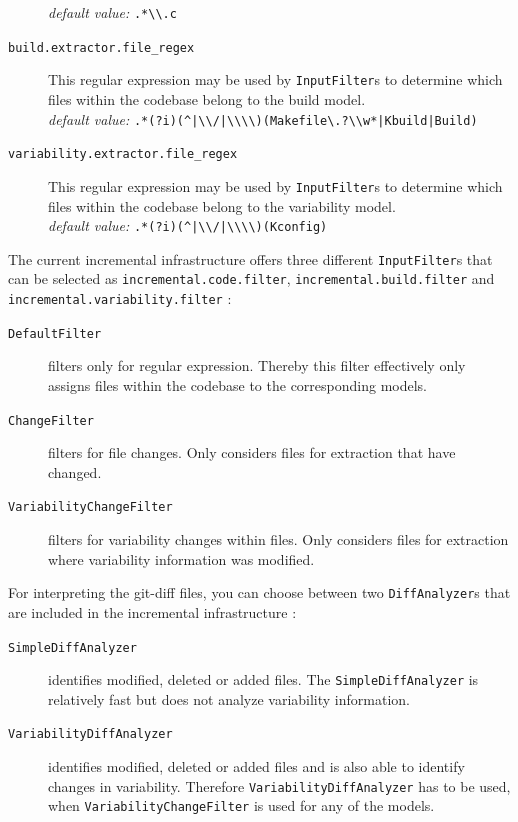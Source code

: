 \documentclass[a4paper]{article}
\begin{document}
\begin{description}
	    \emph{default value:} \lstinline[columns=fixed]{.*\\.c}
	\item[\texttt{build.extractor.file\_regex}] This regular expression may be used by \texttt{Input\-Filter}s to determine which files within the codebase belong to the build model. \\
	    \emph{default value:} \lstinline[columns=fixed]{.*(?i)(^|\\/|\\\\)(Makefile\.?\\w*|Kbuild|Build)}
	\item[\texttt{variability.extractor.file\_regex}] This regular expression may be used by \texttt{InputFilter}s to determine which files within the codebase belong to the variability model.  \\
	\emph{default value:} \lstinline[columns=fixed]{.*(?i)(^|\\/|\\\\)(Kconfig)}
\end{description}

The current incremental infrastructure offers three different \texttt{InputFilter}s that can be selected as \texttt{incremental.code.filter}, \texttt{incremental.build.filter} and \texttt{incremental.variability.filter} :

\begin{description}
	\item[\texttt{DefaultFilter}] filters only for regular expression. Thereby this filter effectively only assigns files within the codebase to the corresponding models.
	\item[\texttt{ChangeFilter}] filters for file changes. Only considers files for extraction that have changed.
	\item[\texttt{VariabilityChangeFilter}] filters for variability changes within files. Only considers files for extraction where variability information was modified.
\end{description}

For interpreting the git-diff files, you can choose between two \texttt{DiffAnalyzer}s that are included in the incremental infrastructure :

\begin{description}
	\item[\texttt{SimpleDiffAnalyzer}] identifies modified, deleted or added files. The \texttt{Simple\-Diff\-Analyzer} is relatively fast but does not analyze variability information.
	\item[\texttt{VariabilityDiffAnalyzer}] identifies modified, deleted or added files and is also able to identify changes in variability. Therefore \texttt{Variability\-Diff\-Analyzer} has to be used, when \texttt{VariabilityChangeFilter} is used for any of the models.
\end{description}
\end{document}
